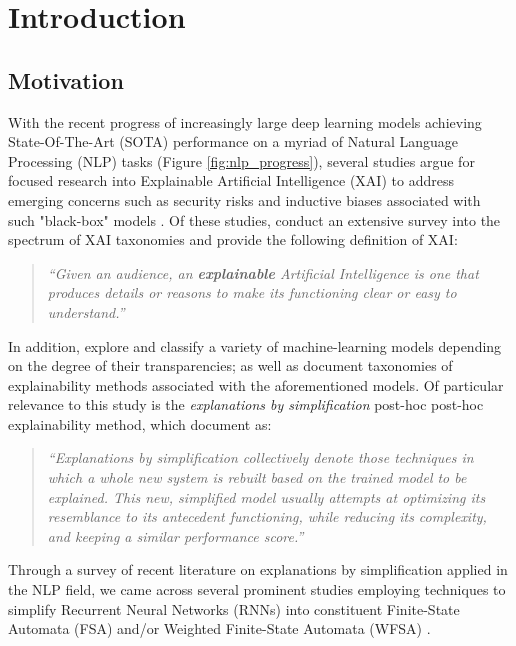 \chapter{Introduction}

\label{introduction}

\section{Motivation}

With the recent progress of increasingly large deep learning models achieving State-Of-The-Art (SOTA) performance on a myriad of Natural Language Processing (NLP) tasks (Figure \ref{fig:nlp_progress}), several studies argue for focused research into Explainable Artificial Intelligence (XAI) to address emerging concerns such as security risks and inductive biases associated with such "black-box" models \citep{doran2017does,townsend2019extracting,danilevsky2020survey,arrieta2020explainable}. Of these studies, \citet{arrieta2020explainable} conduct an extensive survey into the spectrum of XAI taxonomies and provide the following definition of XAI:

\begin{quote}
  \textit{``Given an audience, an \textbf{explainable} Artificial Intelligence is one that produces details or reasons to make its functioning clear or easy to understand.''}
\end{quote}

In addition, \citet{arrieta2020explainable} explore and classify a variety of machine-learning models depending on the degree of their transparencies; as well as document taxonomies of explainability methods associated with the aforementioned models. Of particular relevance to this study is the \textit{explanations by simplification} post-hoc post-hoc explainability method, which \citet{arrieta2020explainable} document as:

\begin{quote}
\textit{``Explanations by simplification collectively denote those techniques in which a whole new system is rebuilt based on the trained model to be explained. This new, simplified model usually attempts at optimizing its resemblance to its antecedent functioning, while reducing its complexity, and keeping a similar performance score.''} 
\end{quote}

Through a survey of recent literature on explanations by simplification applied in the NLP field, we came across several prominent studies employing techniques to simplify Recurrent Neural Networks (RNNs) into constituent Finite-State Automata (FSA) and/or Weighted Finite-State Automata (WFSA) \citep{schwartz2018sopa,peng2018rational,DBLP:journals/corr/abs-1905-08701,wang2019state,jiang2020cold}.

